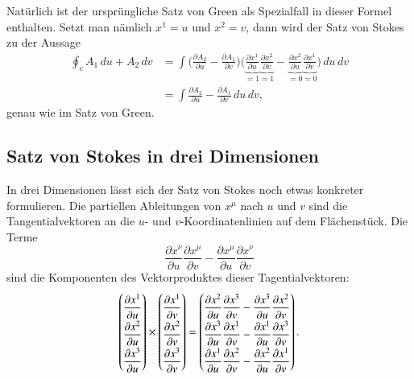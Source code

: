 Natürlich ist der ursprüngliche Satz von Green als Spezialfall in dieser
Formel enthalten.
Setzt man nämlich $x^1=u$ und $x^2=v$, dann wird der Satz von Stokes zu
der Aussage
\begin{align*}
\oint_c A_1\,du + A_2\,dv
&=
\int
\biggl(
\frac{\partial A_2}{\partial u}-\frac{\partial A_1}{\partial v}
\biggr)
\biggl(
\underbrace{\frac{\partial x^1}{\partial u}}_{=1}
\underbrace{\frac{\partial x^2}{\partial v}}_{=1}
-
\underbrace{\frac{\partial x^2}{\partial u}}_{=0}
\underbrace{\frac{\partial x^1}{\partial v}}_{=0}
\biggr)
\,du\,dv
\\
&=
\int
\frac{\partial A_2}{\partial u}-\frac{\partial A_1}{\partial v}
\,du\,dv,
\end{align*}
genau wie im Satz von Green.

\subsection{Satz von Stokes in drei Dimensionen%
\label{skript:kruemmung:section:stokes3}}
In drei Dimensionen lässt sich der Satz von Stokes noch etwas konkreter
formulieren.
Die partiellen Ableitungen von $x^\mu$ nach $u$ und $v$ sind die 
Tangentialvektoren an die $u$- und $v$-Koordinatenlinien auf dem 
Flächenstück.
Die Terme
\[
\frac{\partial x^\nu}{\partial u} \frac{\partial x^\mu}{\partial v}
-
\frac{\partial x^\mu}{\partial u} \frac{\partial x^\nu}{\partial v}
\]
sind die Komponenten des Vektorproduktes dieser Tagentialvektoren:
\[
\def\arraystretch{2.0}
\begin{pmatrix}
\displaystyle \frac{\partial x^1}{\partial u}\\
\displaystyle \frac{\partial x^2}{\partial u}\\
\displaystyle \frac{\partial x^3}{\partial u}
\end{pmatrix}
\times
\begin{pmatrix}
\displaystyle \frac{\partial x^1}{\partial v}\\
\displaystyle \frac{\partial x^2}{\partial v}\\
\displaystyle \frac{\partial x^3}{\partial v}
\end{pmatrix}
=
\begin{pmatrix}
\displaystyle
\frac{\partial x^2}{\partial u}\frac{\partial x^3}{\partial v}
-
\frac{\partial x^3}{\partial u}\frac{\partial x^2}{\partial v}
\\
\displaystyle
\frac{\partial x^3}{\partial u}\frac{\partial x^1}{\partial v}
-
\frac{\partial x^1}{\partial u}\frac{\partial x^3}{\partial v}
\\
\displaystyle
\frac{\partial x^1}{\partial u}\frac{\partial x^2}{\partial v}
-
\frac{\partial x^2}{\partial u}\frac{\partial x^1}{\partial v}
\end{pmatrix}.
\]
